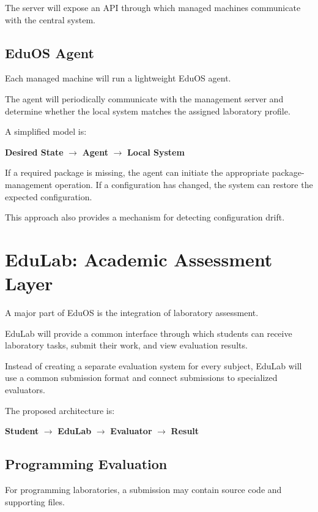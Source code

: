 \documentclass[12pt,a4paper]{article}
\begin{document}
The server will expose an API through which managed machines communicate with the central system.

\subsection{EduOS Agent}

Each managed machine will run a lightweight EduOS agent.

The agent will periodically communicate with the management server and determine whether the local system matches the assigned laboratory profile.

A simplified model is:

\begin{center}
\textbf{Desired State}
$\rightarrow$
\textbf{Agent}
$\rightarrow$
\textbf{Local System}
\end{center}

If a required package is missing, the agent can initiate the appropriate package-management operation. If a configuration has changed, the system can restore the expected configuration.

This approach also provides a mechanism for detecting configuration drift.

\section{EduLab: Academic Assessment Layer}

A major part of EduOS is the integration of laboratory assessment.

EduLab will provide a common interface through which students can receive laboratory tasks, submit their work, and view evaluation results.

Instead of creating a separate evaluation system for every subject, EduLab will use a common submission format and connect submissions to specialized evaluators.

The proposed architecture is:

\begin{center}
\textbf{Student}
$\rightarrow$
\textbf{EduLab}
$\rightarrow$
\textbf{Evaluator}
$\rightarrow$
\textbf{Result}
\end{center}

\subsection{Programming Evaluation}

For programming laboratories, a submission may contain source code and supporting files.
\end{document}
